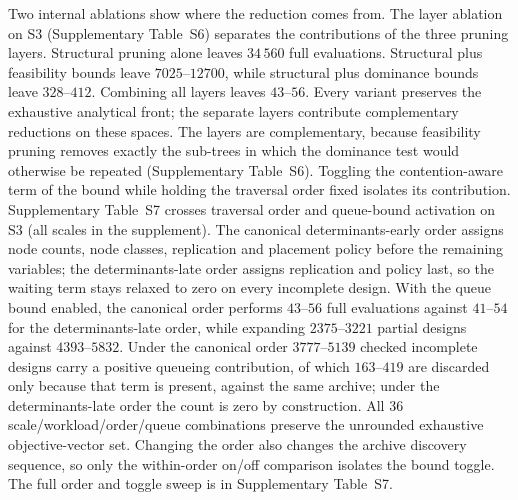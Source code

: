 \documentclass[pdflatex,sn-nature,lineno]{sn-jnl}
\newcommand{\SthreeEvalRange}{43\text{--}56}
\newcommand{\RefAblationSite}{Supplementary Table~S6}
\newcommand{\RefOrderTab}{Supplementary Table~S7}
\begin{document}
Two internal ablations show where the reduction comes from.
%
The layer ablation on S3 (\RefAblationSite{}) separates the contributions of the three pruning layers. Structural pruning alone leaves $34\,560$ full evaluations. Structural plus feasibility bounds leave $7025\text{--}12700$, while structural plus dominance bounds leave $328\text{--}412$. Combining all layers leaves $\SthreeEvalRange$. Every variant preserves the exhaustive analytical front; the separate layers contribute complementary reductions on these spaces.
The layers are complementary, because feasibility pruning removes exactly the sub-trees in
which the dominance test would otherwise be repeated (Supplementary Table~S6). Toggling
the contention-aware term of the bound while holding the traversal order fixed isolates
its contribution.
%
\RefOrderTab{} crosses traversal order and queue-bound activation on S3 (all scales in the supplement). The canonical determinants-early order assigns node counts, node classes, replication and placement policy before the remaining variables; the determinants-late order assigns replication and policy last, so the waiting term stays relaxed to zero on every incomplete design. With the queue bound enabled, the canonical order performs $43\text{--}56$ full evaluations against $41\text{--}54$ for the determinants-late order, while expanding $2375\text{--}3221$ partial designs against $4393\text{--}5832$. Under the canonical order $3777\text{--}5139$ checked incomplete designs carry a positive queueing contribution, of which $163\text{--}419$ are discarded only because that term is present, against the same archive; under the determinants-late order the count is zero by construction. All 36 scale/workload/order/queue combinations preserve the unrounded exhaustive objective-vector set. Changing the order also changes the archive discovery sequence, so only the within-order on/off comparison isolates the bound toggle.
The full order and toggle sweep is in Supplementary Table~S7.
\end{document}
